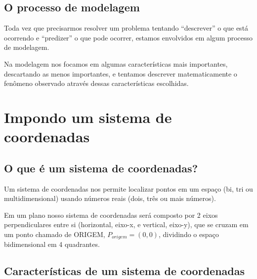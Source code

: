 \documentclass[pdftex, brazil, 12pt, twoside]{article}
\begin{document}
\subsection{O processo de modelagem}
\label{aquecimento-processo-modelagem}

Toda vez que precisarmos resolver um problema tentando ``descrever'' o que está
ocorrendo e ``predizer'' o que pode ocorrer, estamos envolvidos em algum
processo de modelagem.

Na modelagem nos focamos em algumas características mais importantes, descartando
as menos importantes, e tentamos descrever matematicamente o fenômeno observado
através dessas características escolhidas.


\section{Impondo um sistema de coordenadas}
\label{sistema-coordenadas}

\subsection{O que é um sistema de coordenadas?}
\label{sistema-coordenadas-def}

Um sistema de coordenadas nos permite localizar pontos em um espaço (bi, tri ou
multidimensional) usando números reais (dois, três ou mais números).

Em um plano nosso sistema de coordenadas será composto por 2 eixos perpendiculares
entre si (horizontal, eixo-x, e vertical, eixo-y), que se cruzam em um ponto
chamado de ORIGEM, $P_{origem} = (0, 0)$, dividindo o espaço bidimensional
em 4 quadrantes.

\subsection{Características de um sistema de coordenadas}
\label{sistema-coordenadas-caracteristicas}
\end{document}
